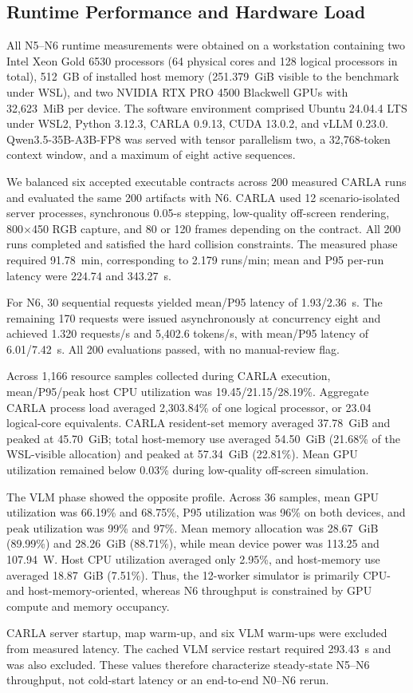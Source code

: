 
\subsection{Runtime Performance and Hardware Load}

All N5--N6 runtime measurements were obtained on a workstation containing two
Intel Xeon Gold 6530 processors (64 physical cores and 128 logical processors
in total), 512~GB of installed host memory (251.379~GiB visible to the
benchmark under WSL), and two NVIDIA RTX PRO 4500 Blackwell GPUs with
32,623~MiB per device. The software environment comprised
Ubuntu 24.04.4 LTS under WSL2, Python 3.12.3, CARLA 0.9.13, CUDA 13.0.2, and
vLLM 0.23.0. Qwen3.5-35B-A3B-FP8 was served with tensor parallelism two, a
32,768-token context window, and a maximum of eight active sequences.

We balanced six accepted executable contracts across 200 measured CARLA runs
and evaluated the same 200 artifacts with N6. CARLA used 12 scenario-isolated
server processes, synchronous 0.05-s stepping, low-quality off-screen
rendering, 800$\times$450 RGB capture, and 80 or 120 frames depending on the
contract. All 200 runs completed and satisfied the hard collision constraints.
The measured phase required 91.78~min, corresponding to 2.179 runs/min; mean
and P95 per-run latency were 224.74 and 343.27~s.

For N6, 30 sequential requests yielded mean/P95 latency of 1.93/2.36~s. The
remaining 170 requests were issued asynchronously at concurrency eight and
achieved 1.320 requests/s and 5,402.6 tokens/s, with mean/P95 latency of
6.01/7.42~s. All 200 evaluations passed, with no manual-review flag.

Across 1,166 resource samples collected during CARLA execution, mean/P95/peak
host CPU utilization was 19.45/21.15/28.19\%. Aggregate CARLA process load
averaged 2,303.84\% of one logical processor, or 23.04 logical-core equivalents.
CARLA resident-set memory averaged 37.78~GiB and peaked at 45.70~GiB; total
host-memory use averaged 54.50~GiB (21.68\% of the WSL-visible allocation) and
peaked at 57.34~GiB (22.81\%). Mean GPU utilization remained below 0.03\%
during low-quality off-screen simulation.

The VLM phase showed the opposite profile. Across 36 samples, mean GPU
utilization was 66.19\% and 68.75\%, P95 utilization was 96\% on both devices,
and peak utilization was 99\% and 97\%. Mean memory allocation was 28.67~GiB
(89.99\%) and 28.26~GiB (88.71\%), while mean device power was 113.25 and
107.94~W. Host CPU utilization averaged only 2.95\%, and host-memory use
averaged 18.87~GiB (7.51\%). Thus, the 12-worker simulator is primarily
CPU- and host-memory-oriented, whereas N6 throughput is constrained by GPU
compute and memory occupancy.

CARLA server startup, map warm-up, and six VLM warm-ups were excluded from
measured latency. The cached VLM service restart required 293.43~s and was also
excluded. These values therefore characterize steady-state N5--N6 throughput,
not cold-start latency or an end-to-end N0--N6 rerun.

